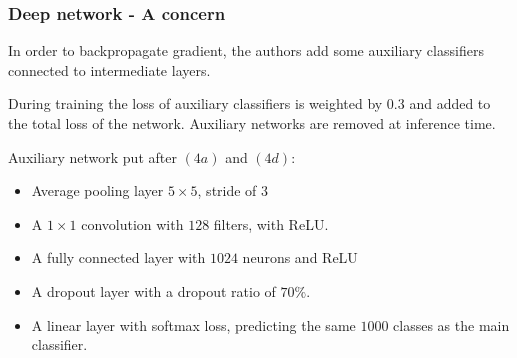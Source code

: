 \begin{frame}
	\frametitle{Deep network - A concern}

	In order to backpropagate gradient, the authors add some auxiliary classifiers connected to intermediate layers.

	\smallskip
	During training the loss of auxiliary classifiers is weighted by $0.3$ and added to the total loss of the network. Auxiliary networks are removed at inference time.

	\bigskip

	Auxiliary network put after $(4a)$ and $(4d)$:
	\begin{itemize}
		\item Average pooling layer $5\times 5$, stride of $3$
		\item A $1 \times 1$ convolution with $128$ filters, with ReLU.
		\item A fully connected layer with $1024$ neurons and ReLU
		\item A dropout layer with a dropout ratio of $70\%$.
		\item A linear layer with softmax loss, predicting the same $1000$ classes as the main classifier.
	\end{itemize}

\end{frame}




